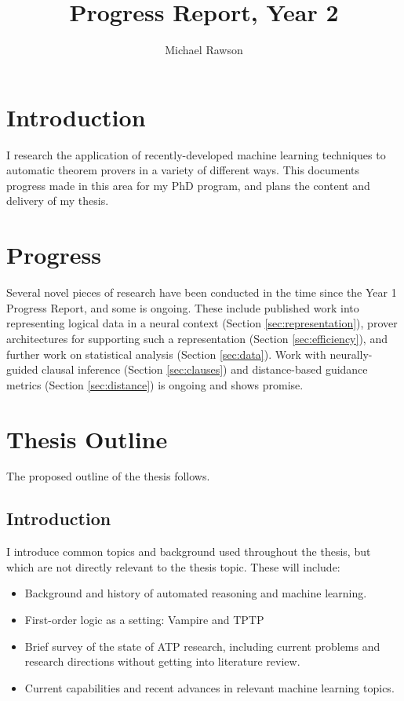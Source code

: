 \documentclass[a4paper]{article}
\title{Progress Report, Year 2}
\author{Michael Rawson}
\begin{document}
\maketitle
\section{Introduction}
I research the application of recently-developed machine learning techniques to automatic theorem provers in a variety of different ways.
This documents progress made in this area for my PhD program, and plans the content and delivery of my thesis.

\section{Progress}
Several novel pieces of research have been conducted in the time since the Year 1 Progress Report, and some is ongoing.
These include published work into representing logical data in a neural context (Section \ref{sec:representation}), prover architectures for supporting such a representation (Section \ref{sec:efficiency}), and further work on statistical analysis (Section \ref{sec:data}).
Work with neurally-guided clausal inference (Section \ref{sec:clauses}) and distance-based guidance metrics (Section \ref{sec:distance}) is ongoing and shows promise.

\section{Thesis Outline}
The proposed outline of the thesis follows.

\subsection{Introduction}
I introduce common topics and background used throughout the thesis, but which are not directly relevant to the thesis topic.
These will include:
\begin{itemize}
	\item Background and history of automated reasoning and machine learning.
	\item First-order logic as a setting: Vampire and TPTP
	\item Brief survey of the state of ATP research, including current problems and research directions without getting into literature review.
	\item Current capabilities and recent advances in relevant machine learning topics.
\end{itemize}
\end{document}

